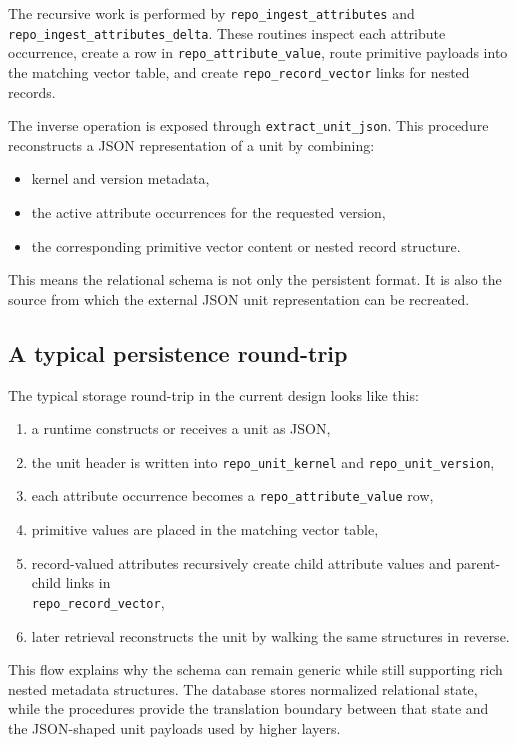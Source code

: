 The recursive work is performed by \texttt{repo\_ingest\_attributes} and \texttt{repo\_ingest\_attributes\_delta}. These routines inspect each attribute occurrence, create a row in \texttt{repo\_attribute\_value}, route primitive payloads into the matching vector table, and create \texttt{repo\_record\_vector} links for nested records.

The inverse operation is exposed through \texttt{extract\_unit\_json}. This procedure reconstructs a JSON representation of a unit by combining:
\begin{itemize}
\item kernel and version metadata,
\item the active attribute occurrences for the requested version,
\item the corresponding primitive vector content or nested record structure.
\end{itemize}

This means the relational schema is not only the persistent format. It is also the source from which the external JSON unit representation can be recreated.

\subsection{A typical persistence round-trip}

The typical storage round-trip in the current design looks like this:
\begin{enumerate}
\item a runtime constructs or receives a unit as JSON,
\item the unit header is written into \texttt{repo\_unit\_kernel} and \texttt{repo\_unit\_version},
\item each attribute occurrence becomes a \texttt{repo\_attribute\_value} row,
\item primitive values are placed in the matching vector table,
\item record-valued attributes recursively create child attribute values and parent-child links in \\ \texttt{repo\_record\_vector},
\item later retrieval reconstructs the unit by walking the same structures in reverse.
\end{enumerate}

This flow explains why the schema can remain generic while still supporting rich nested metadata structures. The database stores normalized relational state, while the procedures provide the translation boundary between that state and the JSON-shaped unit payloads used by higher layers.

